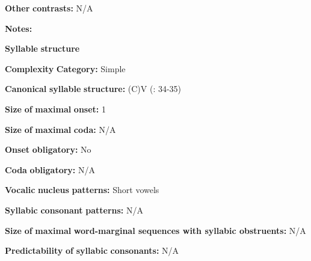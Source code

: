 \documentclass[output=paper]{langsci/langscibook}
\begin{document}
\begin{styleBody}
\textbf{Other} \textbf{contrasts:} N/A
\end{styleBody}

\begin{styleBody}
\textbf{Notes:}
\end{styleBody}

\begin{styleBody}
\textbf{Syllable} \textbf{structure}
\end{styleBody}

\begin{styleBody}
\textbf{Complexity} \textbf{Category:} Simple
\end{styleBody}

\begin{styleBody}
\textbf{Canonical} \textbf{syllable} \textbf{structure:} (C)V (\citealt{BlackingsFabb2003}: 34-35)
\end{styleBody}

\begin{styleBody}
\textbf{Size} \textbf{of} \textbf{maximal} \textbf{onset:} 1
\end{styleBody}

\begin{styleBody}
\textbf{Size} \textbf{of} \textbf{maximal} \textbf{coda:} N/A
\end{styleBody}

\begin{styleBody}
\textbf{Onset} \textbf{obligatory:} No
\end{styleBody}

\begin{styleBody}
\textbf{Coda} \textbf{obligatory:} N/A
\end{styleBody}

\begin{styleBody}
\textbf{Vocalic} \textbf{nucleus} \textbf{patterns:} Short vowels
\end{styleBody}

\begin{styleBody}
\textbf{Syllabic} \textbf{consonant} \textbf{patterns:} N/A
\end{styleBody}

\begin{styleBody}
\textbf{Size} \textbf{of} \textbf{maximal} \textbf{word{}-marginal sequences with syllabic obstruents:} N/A
\end{styleBody}

\begin{styleBody}
\textbf{Predictability} \textbf{of} \textbf{syllabic} \textbf{consonants:} N/A
\end{styleBody}
\end{document}
